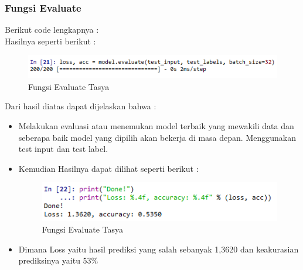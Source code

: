 \subsubsection{Fungsi Evaluate}
Berikut code lengkapnya : \\

Hasilnya seperti berikut :\\
\begin{figure}[ht]
\centering
\includegraphics[scale=0.5]{figures/chapter6tasya20.png}
\caption{Fungsi Evaluate Tasya}
\label{Praktek}
\end{figure}
Dari hasil diatas dapat dijelaskan bahwa :\\
\begin{itemize}
\item Melakukan evaluasi atau  menemukan model terbaik yang mewakili data dan seberapa baik model yang dipilih akan bekerja di masa depan. Menggunakan test input dan test label.
\item Kemudian Hasilnya dapat dilihat seperti berikut :
\begin{figure}[ht]
\centering
\includegraphics[scale=0.5]{figures/chapter6tasya21.png}
\caption{Fungsi Evaluate Tasya}
\label{Praktek}
\end{figure}
\item Dimana Loss yaitu hasil prediksi yang salah sebanyak 1,3620 dan keakurasian prediksinya yaitu 53\%
\end{itemize}

